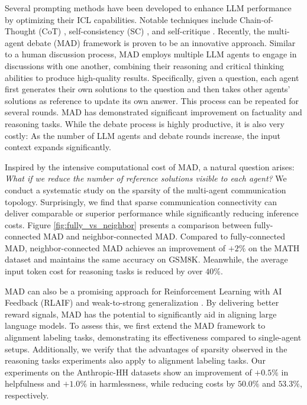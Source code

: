 \documentclass[11pt]{article}
\begin{document}
Several prompting methods have been developed to enhance LLM performance by optimizing their ICL capabilities. Notable techniques include Chain-of-Thought (CoT) \cite{wei2022chain}, self-consistency (SC) \cite{wang2022self}, and self-critique \cite{madaan2024self,welleck2022generating,shinn2024reflexion}. Recently, the multi-agent debate (MAD) framework is proven to be an innovative approach. Similar to a human discussion process, MAD employs multiple LLM agents to engage in discussions with one another, combining their reasoning and critical thinking abilities to produce high-quality results. Specifically, given a question, each agent first generates their own solutions to the question and then takes other agents' solutions as reference to update its own answer. This process can be repeated for several rounds. MAD has demonstrated significant improvement on factuality and reasoning tasks. While the debate process is highly productive, it is also very costly: As the number of LLM agents and debate rounds increase, the input context expands significantly.

Inspired by the intensive computational cost of MAD, a natural question arises: \textit{What if we reduce the number of reference solutions visible to each agent?} We conduct a systematic study on the sparsity of the multi-agent communication topology. Surprisingly, we find that sparse communication connectivity can deliver comparable or superior performance while significantly reducing inference costs. Figure \ref{fig:fully_vs_neighbor} presents a comparison between fully-connected MAD and neighbor-connected MAD. Compared to fully-connected MAD, neighbor-connected MAD achieves an improvement of $+2\%$ on the MATH dataset and maintains the same accuracy on GSM8K. Meanwhile, the average input token cost for reasoning tasks is reduced by over $40\%$.

MAD can also be a promising approach for Reinforcement Learning with AI Feedback (RLAIF) \cite{bai2022constitutional,lee2023rlaif} and weak-to-strong generalization \cite{burns2023weak}. By delivering better reward signals, MAD has the potential to significantly aid in aligning large language models. To assess this, we first extend the MAD framework to alignment labeling tasks, demonstrating its effectiveness compared to single-agent setups. Additionally, we verify that the advantages of sparsity observed in the reasoning tasks experiments also apply to alignment labeling tasks. Our experiments on the Anthropic-HH datasets
show an improvement of $+0.5\%$ in helpfulness and $+1.0\%$ in harmlessness, while reducing costs by $50.0\%$ and $53.3\%$, respectively.
\end{document}
